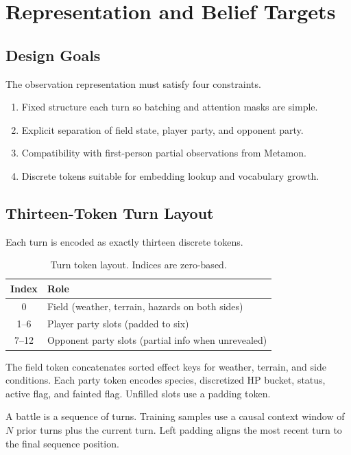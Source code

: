 \chapter{Representation and Belief Targets}
\label{ch:representation}

\section{Design Goals}

The observation representation must satisfy four constraints.
\begin{enumerate}
  \item Fixed structure each turn so batching and attention masks are simple.
  \item Explicit separation of field state, player party, and opponent party.
  \item Compatibility with first-person partial observations from Metamon.
  \item Discrete tokens suitable for embedding lookup and vocabulary growth.
\end{enumerate}

\section{Thirteen-Token Turn Layout}

Each turn is encoded as exactly thirteen discrete tokens.

\begin{table}[ht]
  \centering
  \caption{Turn token layout. Indices are zero-based.}
  \label{tab:token-layout}
  \begin{tabular}{cl}
    \toprule
    Index & Role \\
    \midrule
    0 & Field (weather, terrain, hazards on both sides) \\
    1--6 & Player party slots (padded to six) \\
    7--12 & Opponent party slots (partial info when unrevealed) \\
    \bottomrule
  \end{tabular}
\end{table}

The field token concatenates sorted effect keys for weather, terrain, and side
conditions. Each party token encodes species, discretized HP bucket, status,
active flag, and fainted flag. Unfilled slots use a padding token.

A battle is a sequence of turns. Training samples use a causal context window of
$N$ prior turns plus the current turn. Left padding aligns the most recent turn
to the final sequence position.

